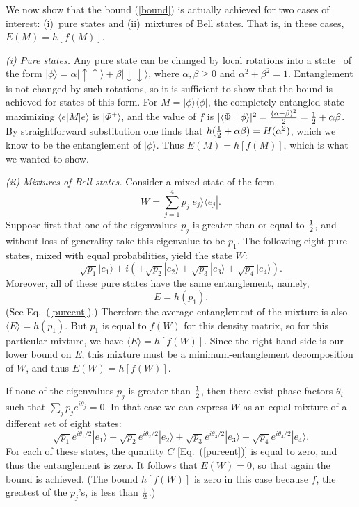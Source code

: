 We now show that the bound (\ref{bound}) is actually achieved
for two cases of interest: (i)~pure states and (ii)~mixtures of
Bell states.  That is, in these cases, $E(M) = h[f(M)]$.
 
{\em(i) Pure states.} Any pure state can be changed by local rotations
into a state~\cite{Peres} of the form $|\phi\rangle =
\alpha|\uparrow\uparrow\rangle + \beta|\downarrow\downarrow\rangle$,
where $\alpha,\beta \ge 0$ and $\alpha^2 + \beta^2 = 1$.  Entanglement
is not changed by such rotations, so it is sufficient to show that the
bound is achieved for states of this form.  For $M=
|\phi\rangle\langle\phi|$, the completely entangled state maximizing
$\langle e|M|e \rangle$ is $|\Phi^+\rangle$, and the value of $f$ is
$|\langle\Phi^+|\phi\rangle|^2 = {(\alpha + \beta)^2 \over 2} = \mbox{$\textstyle \frac{1}{2}$}
+ \alpha\beta$.  By straightforward substitution one finds that
$h(\mbox{$\textstyle \frac{1}{2}$} + \alpha\beta) = H(\alpha^2)$, which we know to be the
entanglement of $|\phi\rangle$.  Thus $E(M) = h[f(M)]$, which is what
we wanted to show.
 
{\em(ii) Mixtures of Bell states.} Consider a mixed
state of the form
\begin{equation}
W = \sum_{j=1}^4 p_j|e_j\rangle\langle e_j|.\label{firstW}
\end{equation}
Suppose first that one of the eigenvalues $p_j$ is greater than
or equal to $\mbox{$\textstyle \frac{1}{2}$}$, and without loss of generality take this
eigenvalue to be $p_1$.  The following eight pure states, mixed
with equal probabilities, yield the state $W$:
\begin{equation}
\sqrt{p_1}|e_1\rangle + i(\pm \sqrt{p_2}|e_2\rangle
\pm \sqrt{p_3}|e_3\rangle \pm \sqrt{p_4}|e_4\rangle).
\end{equation}
Moreover, all of these pure states have the same entanglement,
namely,
\begin{equation}
E = h(p_1).
\end{equation}
(See Eq.~(\ref{pureent}).)  Therefore the average entanglement
of the mixture is also $\langle E \rangle = h(p_1)$.  But $p_1$
is equal to
$f(W)$ for this density matrix, so for this particular
mixture, we have $\langle E \rangle = h[f(W)]$.  Since
the right hand side is our lower bound on $E$, this mixture
must be a minimum-entanglement decomposition of $W$,
and thus $E(W) = h[f(W)]$.
 
If none of the eigenvalues $p_j$ is greater
than $\mbox{$\textstyle \frac{1}{2}$}$, then there exist phase factors $\theta_i$ such that
$\sum_j p_j e^{i\theta_j} = 0$.  In that case we can express
$W$ as an equal mixture of a different set of eight states:
\begin{equation}
\sqrt{p_1}e^{i\theta_1/2}|e_1\rangle
\pm \sqrt{p_2}e^{i\theta_2/2}|e_2\rangle
\pm \sqrt{p_3}e^{i\theta_3/2}|e_3\rangle
\pm \sqrt{p_4}e^{i\theta_4/2}|e_4\rangle.
\end{equation}
For each of these states, the quantity $C$ [Eq.~(\ref{pureent})]
is equal to zero, and thus the entanglement is zero.  It follows
that $E(W) = 0$, so that again the bound is achieved. (The
bound $h[f(W)]$ is zero in this case because $f$, the greatest
of the $p_j$'s, is less than $\mbox{$\textstyle \frac{1}{2}$}$.)
 

